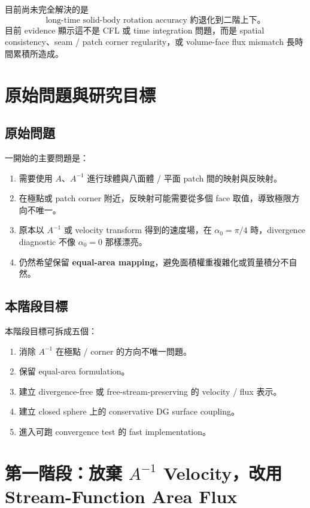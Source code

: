 \documentclass[UTF8,12pt,a4paper]{ctexart}
\begin{document}
目前尚未完全解決的是
\[
\boxed{
\text{long-time solid-body rotation accuracy 約退化到二階上下。}
}
\]
目前 evidence 顯示這不是 CFL 或 time integration 問題，而是 spatial consistency、seam / patch corner regularity，或 volume-face flux mismatch 長時間累積所造成。

\section{原始問題與研究目標}

\subsection{原始問題}

一開始的主要問題是：
\begin{enumerate}
  \item 需要使用 $A$、$A^{-1}$ 進行球體與八面體 / 平面 patch 間的映射與反映射。
  \item 在極點或 patch corner 附近，反映射可能需要從多個 face 取值，導致極限方向不唯一。
  \item 原本以 $A^{-1}$ 或 velocity transform 得到的速度場，在 $\alpha_0=\pi/4$ 時，divergence diagnostic 不像 $\alpha_0=0$ 那樣漂亮。
  \item 仍然希望保留 \textbf{equal-area mapping}，避免面積權重複雜化或質量積分不自然。
\end{enumerate}

\subsection{本階段目標}

本階段目標可拆成五個：
\begin{enumerate}
  \item 消除 $A^{-1}$ 在極點 / corner 的方向不唯一問題。
  \item 保留 equal-area formulation。
  \item 建立 divergence-free 或 free-stream-preserving 的 velocity / flux 表示。
  \item 建立 closed sphere 上的 conservative DG surface coupling。
  \item 進入可跑 convergence test 的 fast implementation。
\end{enumerate}

\section{第一階段：放棄 $A^{-1}$ Velocity，改用 Stream-Function Area Flux}
\end{document}
